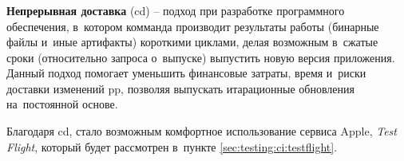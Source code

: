 \subsubsection{}
\label{sec:testing:ci:cd}

\textbf{Непрерывная доставка} (\gls{cd}) -- подход при разработке программного обеспечения, в~котором комманда производит результаты работы (бинарные файлы и~иные артифакты) короткими циклами, делая возможным в~сжатые сроки (относительно запроса о~выпуске) выпустить новую версия приложения. Данный подход помогает уменьшить финансовые затраты, время и~риски доставки изменений \gls{pp}, позволяя выпускать итарационные обновления на~постоянной основе.

Благодаря \gls{cd}, стало возможным комфортное использование сервиса Apple, \textit{Test Flight}, который будет рассмотрен в~пункте \ref{sec:testing:ci:testflight}.